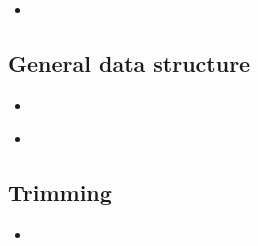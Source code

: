 \documentclass[compress, ucs, xelatex, 11pt, xcolor=x11names, aspectratio=1609,
	hyperref={
		bookmarks=true,
		unicode=true,
		colorlinks=true,
		pdftitle={HybSeq course},
		plainpages=false,
		pdfauthor={Vojtech Zeisek},
		pdfsubject={Practical processing of HybSeq target enrichment sequencing data on computing grids like MetaCentrum},
		pdfcreator={XeLaTeX},
		pdfkeywords={BASH, command line, GNU, HybSeq, Linux, MetaCentrum, sequencing shell, target enrichment},
		linkcolor=Cyan2, %
		anchorcolor=Firebrick2, %
		citecolor=Firebrick2, %
		filecolor=Firebrick2, %
		menucolor=Firebrick2, %
		urlcolor=Chartreuse2, %
		pdftex},
	url={hyphens, lowtilde} %
	]{beamer}
\begin{document}
\begin{frame}[fragile]{}
	\begin{itemize}
		\item 
	\end{itemize}
	\begin{spluscode}
    
	\end{spluscode}
	\begin{bashcode}
    
	\end{bashcode}
\end{frame}

\subsection{General data structure}

\begin{frame}[fragile]{}
	\begin{itemize}
		\item 
	\end{itemize}
	\begin{spluscode}
    
	\end{spluscode}
	\begin{bashcode}
    
	\end{bashcode}
\end{frame}

\begin{frame}[fragile]{}
	\begin{itemize}
		\item 
	\end{itemize}
	\begin{spluscode}
    
	\end{spluscode}
	\begin{bashcode}
    
	\end{bashcode}
\end{frame}

\subsection{Trimming}

\begin{frame}[fragile]{}
	\begin{itemize}
		\item 
	\end{itemize}
	\begin{spluscode}
    
	\end{spluscode}
	\begin{bashcode}
    
	\end{bashcode}
\end{frame}
\end{document}
